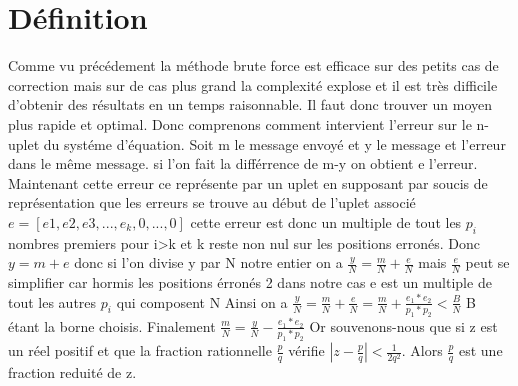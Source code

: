 \documentclass[a4paper, 11pt]{report}
\begin{document}
\section{Définition}
Comme vu précédement la méthode brute force est efficace sur des petits cas de 
correction mais sur de cas plus grand la complexité explose et il est très difficile d'obtenir des résultats en un temps raisonnable.\newline
Il faut donc trouver un moyen plus rapide et optimal. Donc comprenons comment intervient l'erreur sur le n-uplet du systéme d'équation.\newline
Soit m le message envoyé et y le message et l'erreur dans le même message. si l'on fait la différrence de m-y on obtient e l'erreur.
Maintenant cette erreur ce représente par un uplet en supposant par soucis de représentation que les erreurs se trouve au début de l'uplet associé
$e = [e1,e2,e3,...,e_k,0,...,0]$ cette erreur est donc un multiple de tout les $p_i$ nombres premiers pour i>k et k  reste non nul sur les positions erronés.\newline
Donc $y = m + e$ donc si l'on divise y par N notre entier on a $\frac{y}{N}=\frac{m}{N}+\frac{e}{N}$\newline
mais $\frac{e}{N}$ peut se simplifier car hormis les positions érronés 2 dans notre cas e est un multiple de tout les autres $p_i$ qui composent N\newline
Ainsi on a  $\frac{y}{N}=\frac{m}{N}+\frac{e}{N}=\frac{m}{N}+ \frac{e_1 * e_2}{p_1 * p_2 } <\frac{B}{N} $    B étant la borne choisis.\newline
Finalement $\frac{m}{N}=\frac{y}{N} - \frac{e_1 * e_2}{p_1 * p_2 } $ \newline
\newline
Or souvenons-nous que si z est un réel positif et que la fraction rationnelle $\frac{p}{q}$
vérifie $ \left| z - \frac{p}{q} \right| < \frac{1}{2q^2} $. 
Alors $\frac{p}{q}$ est une fraction reduité de z.\newline
\newline
\end{document}
